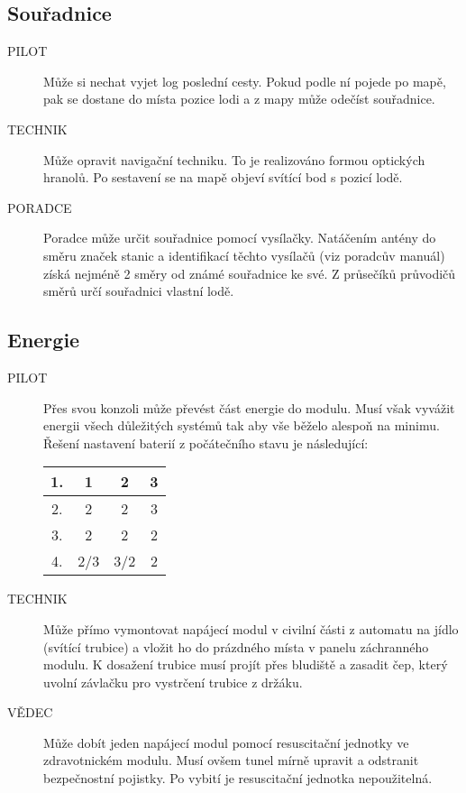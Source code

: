 \documentclass[11pt,oneside,a4paper]{article}
\begin{document}
\subsection{\texorpdfstring{Souřadnice}{Souradnice}}
\label{subsec:souradnice}

\begin{description}
\item[PILOT] Může si nechat vyjet log poslední cesty. Pokud podle ní pojede po mapě, pak se dostane do místa pozice lodi a z mapy může odečíst souřadnice.
\item[TECHNIK] Může opravit navigační techniku. To je realizováno formou optických hranolů. Po sestavení se na mapě objeví svítící bod s pozicí lodě.
\item[PORADCE] Poradce může určit souřadnice pomocí vysílačky. Natáčením antény do směru značek stanic a identifikací těchto vysílačů (viz poradcův manuál) získá nejméně 2 směry od známé souřadnice ke své. Z průsečíků průvodičů směrů určí souřadnici vlastní lodě. 
\end{description}

\subsection{\texorpdfstring{Energie}{Energie}}
\label{subsec:energie}

\begin{description}
\item[PILOT] Přes svou konzoli může převést část energie do modulu. Musí však vyvážit energii všech důležitých systémů tak aby vše běželo alespoň na minimu. Řešení nastavení baterií z počátečního stavu je následující:
\begin{center}
	\begin{tabular}{ c | c | c | c }
	\hline \hline
		1. & 1 & 2 & 3 \\ \hline
		2. & 2 & 2 & 3 \\ \hline
		3. & 2 & 2 & 2 \\ \hline
		4. & 2/3 & 3/2 & 2 \\ \hline \hline
	\end{tabular}
\end{center}
\item[TECHNIK] Může přímo vymontovat napájecí modul v civilní části z automatu na jídlo (svítící trubice) a vložit ho do prázdného místa v panelu záchranného modulu. K dosažení trubice musí projít přes bludiště a zasadit čep, který uvolní závlačku pro vystrčení trubice z držáku.
\item[VĚDEC] Může dobít jeden napájecí modul pomocí resuscitační jednotky ve zdravotnickém modulu. Musí ovšem tunel mírně upravit a odstranit bezpečnostní pojistky. Po vybití je resuscitační jednotka nepoužitelná.
\end{description}
\end{document}
